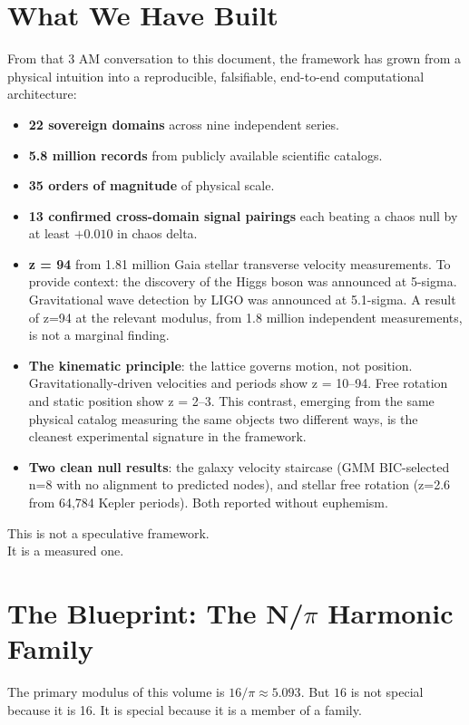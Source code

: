 \documentclass[11pt, letterpaper, openany]{book}
\begin{document}
\section*{What We Have Built}

From that 3 AM conversation to this document, the framework has grown from a physical
intuition into a reproducible, falsifiable, end-to-end computational architecture:

\begin{itemize}
    \item \textbf{22 sovereign domains} across nine independent series.
    \item \textbf{5.8 million records} from publicly available scientific catalogs.
    \item \textbf{35 orders of magnitude} of physical scale.
    \item \textbf{13 confirmed cross-domain signal pairings} each beating a chaos null
    by at least $+0.010$ in chaos delta.
    \item \textbf{z = 94} from 1.81 million Gaia stellar transverse velocity measurements.
    To provide context: the discovery of the Higgs boson was announced at 5-sigma.
    Gravitational wave detection by LIGO was announced at 5.1-sigma. A result of z=94
    at the relevant modulus, from 1.8 million independent measurements, is not a marginal
    finding.
    \item \textbf{The kinematic principle}: the lattice governs motion, not position.
    Gravitationally-driven velocities and periods show z = 10--94. Free rotation and
    static position show z = 2--3. This contrast, emerging from the same physical catalog
    measuring the same objects two different ways, is the cleanest experimental signature
    in the framework.
    \item \textbf{Two clean null results}: the galaxy velocity staircase (GMM
    BIC-selected n=8 with no alignment to predicted nodes), and stellar free rotation
    (z=2.6 from 64,784 Kepler periods). Both reported without euphemism.
\end{itemize}

This is not a speculative framework.\\
It is a measured one.

\section*{The Blueprint: The N/$\pi$ Harmonic Family}

The primary modulus of this volume is $16/\pi \approx 5.093$. But $16$ is not special
because it is 16. It is special because it is a member of a family.
\end{document}
